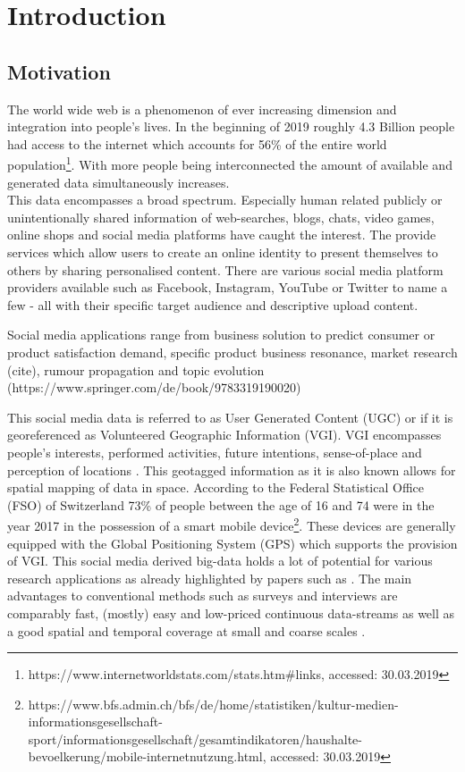 \chapter{Introduction}
\section{Motivation}
The world wide web is a phenomenon of ever increasing dimension and integration into people's lives. In the beginning of 2019 roughly 4.3 Billion people had access to the internet which accounts for 56\% of the entire world population\footnote{https://www.internetworldstats.com/stats.htm\#links, accessed: 30.03.2019}. 
With more people being interconnected the amount of available and generated data simultaneously increases. \\
This data encompasses a broad spectrum. Especially human related publicly or unintentionally shared information of web-searches, blogs, chats, video games, online shops and social media platforms have caught the interest. The  provide services which allow users to create an online identity to present themselves to others by sharing personalised content. There are various social media platform providers available such as Facebook, Instagram, YouTube or Twitter to name a few - all with their specific target audience and descriptive upload content.

Social media applications range from business solution to predict consumer or product satisfaction demand, specific product business resonance,  market research (cite), rumour propagation and topic evolution (https://www.springer.com/de/book/9783319190020)


This social media data is referred to as User Generated Content (UGC) or if it is georeferenced as Volunteered Geographic Information (VGI). VGI encompasses people's interests, performed activities, future intentions, sense-of-place and perception of locations \parencite{Goodchild2007}. This geotagged information as it is also known allows for spatial mapping of data in space.  
According to the Federal Statistical Office (FSO) of Switzerland 73\% of people between the age of 16 and 74 were in the year 2017 in the possession of a smart mobile device\footnote{https://www.bfs.admin.ch/bfs/de/home/statistiken/kultur-medien-informationsgesellschaft-sport/informationsgesellschaft/gesamtindikatoren/haushalte-bevoelkerung/mobile-internetnutzung.html, accessed: 30.03.2019}. These devices are generally equipped with the Global Positioning System (GPS) which supports the provision of VGI.
This social media derived big-data holds a lot of potential for various research applications as already highlighted by papers such as \textcite{DiMinin2015, DiMinin2017, Meentemeyer2016}. The main advantages to conventional methods such as surveys and interviews are comparably fast, (mostly) easy and low-priced continuous data-streams as well as a good spatial and temporal coverage at small \parencite{Buckee2015b} and coarse scales \parencite{Weyland2014}.\\

